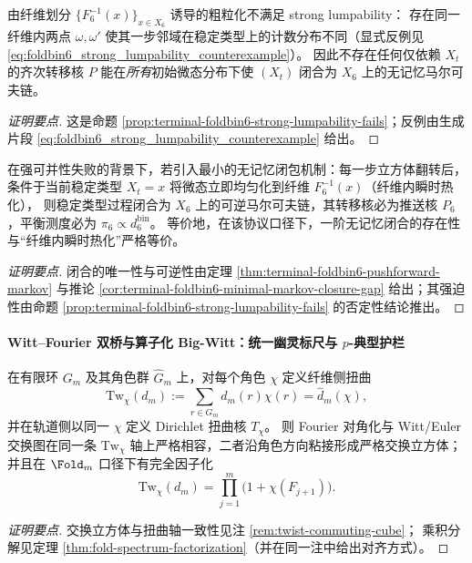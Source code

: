 \begin{conclusion}\label{con:xi-window6-strong-lumpability-failure-structural}
由纤维划分 \(\{F_6^{-1}(x)\}_{x\in X_6}\) 诱导的粗粒化不满足 strong lumpability：
存在同一纤维内两点 \(\omega,\omega'\) 使其一步邻域在稳定类型上的计数分布不同（显式反例见 \eqref{eq:foldbin6_strong_lumpability_counterexample}）。
因此不存在任何仅依赖 \(X_t\) 的齐次转移核 \(P\) 能在\emph{所有}初始微态分布下使 \((X_t)\) 闭合为 \(X_6\) 上的无记忆马尔可夫链。
\end{conclusion}
\begin{proof}[证明要点]
这是命题 \ref{prop:terminal-foldbin6-strong-lumpability-fails}；反例由生成片段 \eqref{eq:foldbin6_strong_lumpability_counterexample} 给出。
\end{proof}

\begin{conclusion}\label{con:xi-window6-instant-thermalization-equivalence}
在强可并性失败的背景下，若引入最小的无记忆闭包机制：每一步立方体翻转后，条件于当前稳定类型 \(X_t=x\) 将微态立即均匀化到纤维 \(F_6^{-1}(x)\)（纤维内瞬时热化），
则稳定类型过程闭合为 \(X_6\) 上的可逆马尔可夫链，其转移核必为推送核 \(P_6\)，平衡测度必为 \(\pi_6\propto d^{\mathrm{bin}}_6\)。
等价地，在该协议口径下，一阶无记忆闭合的存在性与“纤维内瞬时热化”严格等价。
\end{conclusion}
\begin{proof}[证明要点]
闭合的唯一性与可逆性由定理 \ref{thm:terminal-foldbin6-pushforward-markov} 与推论 \ref{cor:terminal-foldbin6-minimal-markov-closure-gap} 给出；其强迫性由命题 \ref{prop:terminal-foldbin6-strong-lumpability-fails} 的否定性结论推出。
\end{proof}

\paragraph{Witt--Fourier 双桥与算子化 Big-Witt：统一幽灵标尺与 \texorpdfstring{$p$}{p}-典型护栏}

\begin{conclusion}\label{con:xi-witt-fourier-commuting-cube}
在有限环 \(G_m\) 及其角色群 \(\widehat G_m\) 上，对每个角色 \(\chi\) 定义纤维侧扭曲
\[
\mathrm{Tw}_\chi(d_m):=\sum_{r\in G_m}d_m(r)\chi(r)=\widehat d_m(\chi),
\]
并在轨道侧以同一 \(\chi\) 定义 Dirichlet 扭曲核 \(T_\chi\)。
则 Fourier 对角化与 Witt/Euler 交换图在同一条 \(\mathrm{Tw}_\chi\) 轴上严格相容，二者沿角色方向粘接形成严格交换立方体；
并且在 \(\Fold_m\) 口径下有完全因子化
\[
\mathrm{Tw}_\chi(d_m)=\prod_{j=1}^m\bigl(1+\chi(F_{j+1})\bigr).
\]
\end{conclusion}
\begin{proof}[证明要点]
交换立方体与扭曲轴一致性见注 \ref{rem:twist-commuting-cube}；
乘积分解见定理 \ref{thm:fold-spectrum-factorization}（并在同一注中给出对齐方式）。
\end{proof}


